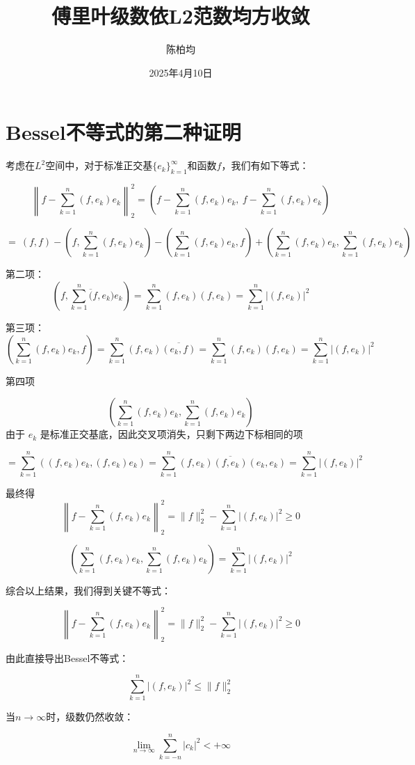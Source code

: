\documentclass[linespread=1.5]{article}
\title{傅里叶级数依L2范数均方收敛}
\author{陈柏均}
\date{2025年4月10日}
\begin{document}
	\maketitle
	
	\section{Bessel不等式的第二种证明}
	
	考虑在$L^2$空间中，对于标准正交基$\{e_k\}_{k=1}^\infty$和函数$f$，我们有如下等式：
	
	\[
	\left\| f - \sum_{k=1}^n (f, e_k) e_k \right\|_2^2 = \left( f - \sum_{k=1}^n (f, e_k) e_k,\ f - \sum_{k=1}^n (f, e_k) e_k \right)
	\]

	\[
		= \ (f, f) - \left( f, \sum_{k=1}^n (f, e_k) e_k \right) - \left( \sum_{k=1}^n (f, e_k) e_k, f \right) + \left( \sum_{k=1}^n (f, e_k) e_k, \sum_{k=1}^n (f, e_k) e_k \right)
	\]

	 第二项：
	 \[
	 \left( f, \sum_{k=1}^n \overline(f, e_k) e_k \right) = \sum_{k=1}^n (f, e_k) (f, e_k) = \sum_{k=1}^n |(f, e_k)|^2
	 \]
	 
	 第三项：
	 \[
	 \left( \sum_{k=1}^n (f, e_k) e_k, f \right) = \sum_{k=1}^n (f, e_k) \overline{(e_k, f)} = \sum_{k=1}^n (f, e_k) {(f, e_k)} = \sum_{k=1}^n |(f, e_k)|^2
	 \]
		
第四项

\[
\left( \sum_{k=1}^n (f, e_k) e_k, \sum_{k=1}^n (f, e_k) e_k \right)
\]
由于 \(e_k\) 是标准正交基底，因此交叉项消失，只剩下两边下标相同的项

\[
= \sum_{k=1}^n \left( (f, e_k) e_k, (f, e_k) e_k \right) = \sum_{k=1}^n (f, e_k) \overline{(f, e_k)} (e_k, e_k) = \sum_{k=1}^n |(f, e_k)|^2
\]

最终得
\[
\left\| f - \sum_{k=1}^n (f, e_k) e_k \right\|_2^2 = \|f\|_2^2 - \sum_{k=1}^n |(f, e_k)|^2 \geq 0
\]

		\[
		\left( \sum_{k=1}^n (f, e_k) e_k, \sum_{k=1}^n (f, e_k) e_k \right) = \sum_{k=1}^n |(f, e_k)|^2
		\]

	
	综合以上结果，我们得到关键不等式：
	
	\[
	\left\| f - \sum_{k=1}^n (f, e_k) e_k \right\|_2^2 = \|f\|_2^2 - \sum_{k=1}^n |(f, e_k)|^2 \geq 0
	\]
	
	由此直接导出Bessel不等式：
	
	\[
	\sum_{k=1}^n |(f, e_k)|^2 \leq \|f\|_2^2
	\]
	
	当$n \to \infty$时，级数仍然收敛：
	
	\[
	\lim_{n \to \infty} \sum_{k=-n}^n |c_k|^2 < +\infty
	\]
	
\end{document}

